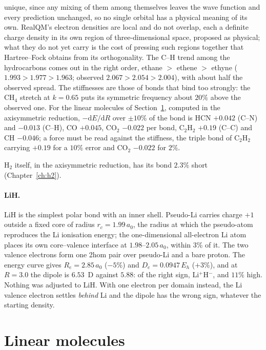 unique, since any mixing of them among themselves leaves the wave function and every prediction unchanged, so
no single orbital has a physical meaning of its own. RealQM's electron densities are local and do not overlap,
each a definite charge density in its own region of three-dimensional space, proposed as physical; what they
do not yet carry is the cost of pressing such regions together that Hartree--Fock obtains from its
orthogonality. The C--H trend among the hydrocarbons
comes out in the right order, ethane $>$ ethene $>$ ethyne ($1.993 > 1.977 > 1.963$; observed $2.067 > 2.054 >
2.004$), with about half the observed spread. The stiffnesses are those of bonds that bind too strongly: the
CH$_4$ stretch at $k = 0.65$ puts its symmetric frequency about $20\%$ above the observed one. For the linear
molecules of Section~\ref{sec:group14}, computed in the axisymmetric reduction, $-\mathrm{d}E/\mathrm{d}R$ over $\pm10\%$ of
the bond is HCN $+0.042$ (C--N) and $-0.013$ (C--H), CO $+0.045$, CO$_2$ $-0.022$ per bond, C$_2$H$_2$ $+0.19$
(C--C) and CH $-0.046$; a force must be read against the stiffness, the triple bond of C$_2$H$_2$ carrying $+0.19$
for a $10\%$ error and CO$_2$ $-0.022$ for $2\%$.

H$_2$ itself, in the axisymmetric reduction, has its bond $2.3\%$ short (Chapter~\ref{ch:h2}).

\paragraph{LiH.} LiH is the simplest polar bond with an inner shell. Pseudo-Li carries charge $+1$ outside
a fixed core of radius $r_c = 1.99\,a_0$, the radius at which the pseudo-atom reproduces the Li ionisation
energy; the one-dimensional all-electron Li atom places its own core--valence interface at
$1.98$--$2.05\,a_0$, within 3\% of it. The two valence electrons form one 2hom pair over pseudo-Li and a
bare proton. The energy curve gives $R_e = 2.85\,a_0$ ($-5\%$) and $D_e = 0.0947\,E_h$ ($+3\%$), and at
$R = 3.0$ the dipole is $6.53$~D against $5.88$: of the right sign, Li$^+$H$^-$, and $11\%$ high. Nothing
was adjusted to LiH. With one electron per domain instead, the Li valence electron settles \emph{behind}
Li and the dipole has the wrong sign, whatever the starting density.

\section{Linear molecules}\label{sec:group14}

